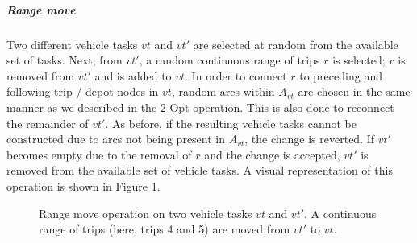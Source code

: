 \documentclass[]{article}
\begin{document}
\noindent\subparagraph{Range move} Two different vehicle tasks $vt$ and $vt'$ are selected at random from the available set of tasks. Next, from $vt'$, a random continuous range of trips $r$ is selected; $r$ is removed from $vt'$ and is added to $vt$. In order to connect $r$ to preceding and following trip / depot nodes in $vt$, random arcs within $A_{vt}$ are chosen in the same manner as we described in the 2-Opt operation. This is also done to reconnect the remainder of $vt'$. As before, if the resulting vehicle tasks cannot be constructed due to arcs not being present in $A_{vt}$, the change is reverted. If $vt'$ becomes empty due to the removal of $r$ and the change is accepted, $vt'$ is removed from the available set of vehicle tasks. A visual representation of this operation is shown in Figure \ref{fig:rangemove-vt}.
\begin{figure}[H]
  \centering
  \caption{Range move operation on two vehicle tasks $vt$ and $vt'$. A continuous range of trips (here, trips 4 and 5) are moved from $vt'$ to $vt$.}
  \label{fig:rangemove-vt}
\end{figure}
\end{document}
